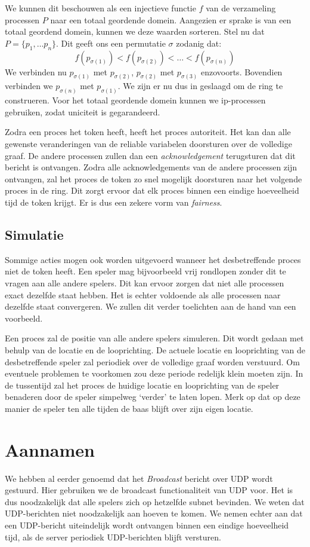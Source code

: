 \documentclass[a4paper,11pt]{article}
\begin{document}
    We kunnen dit beschouwen als een injectieve functie $f$ van de verzameling processen $P$ naar een totaal geordende domein. Aangezien er sprake is van een totaal geordend domein, kunnen we deze waarden sorteren. Stel nu dat $P = \{ p_1, \ldots p_n\}$. Dit geeft ons een permutatie $\sigma$ zodanig dat:
    \[
    f(p_{\sigma(1)}) < f(p_{\sigma(2)}) < \ldots < f(p_{\sigma(n)})
    \]
    We verbinden nu $p_{\sigma(1)}$ met $p_{\sigma(2)}$, $p_{\sigma(2)}$ met $p_{\sigma(3)}$ enzovoorts. Bovendien verbinden we $p_{\sigma(n)}$ met $p_{\sigma(1)}$. We zijn er nu dus in geslaagd om de ring te construeren. Voor het totaal geordende domein kunnen we ip-processen gebruiken, zodat uniciteit is gegarandeerd.

    Zodra een proces het token heeft, heeft het proces autoriteit. Het kan dan alle gewenste veranderingen van de reliable variabelen doorsturen over de volledige graaf. De andere processen zullen dan een \emph{acknowledgement} terugsturen dat dit bericht is ontvangen. Zodra alle acknowledgements van de andere processen zijn ontvangen, zal het proces de token zo snel mogelijk doorsturen naar het volgende proces in de ring. Dit zorgt ervoor dat elk proces binnen een eindige hoeveelheid tijd de token krijgt. Er is dus een zekere vorm van \emph{fairness}.

    \subsection{Simulatie}
    Sommige acties mogen ook worden uitgevoerd wanneer het desbetreffende proces niet de token heeft. Een speler mag bijvoorbeeld vrij rondlopen zonder dit te vragen aan alle andere spelers. Dit kan ervoor zorgen dat niet alle processen exact dezelfde staat hebben. Het is echter voldoende als alle processen naar dezelfde staat convergeren. We zullen dit verder toelichten aan de hand van een voorbeeld.

    Een proces zal de positie van alle andere spelers simuleren. Dit wordt gedaan met behulp van de locatie en de looprichting. De actuele locatie en looprichting van de desbetreffende speler zal periodiek over de volledige graaf worden verstuurd. Om eventuele problemen te voorkomen zou deze periode redelijk klein moeten zijn. In de tussentijd zal het proces de huidige locatie en looprichting van de speler benaderen door de speler simpelweg `verder' te laten lopen. Merk op dat op deze manier de speler ten alle tijden de baas blijft over zijn eigen locatie.

    \section{Aannamen}
    We hebben al eerder genoemd dat het \emph{Broadcast} bericht over UDP wordt gestuurd. Hier gebruiken we de broadcast functionaliteit van UDP voor. Het is dus noodzakelijk dat alle spelers zich op hetzelfde subnet bevinden. We weten dat UDP-berichten niet noodzakelijk aan hoeven te komen. We nemen echter aan dat een UDP-bericht uiteindelijk wordt ontvangen binnen een eindige hoeveelheid tijd, als de server periodiek UDP-berichten blijft versturen.
\end{document}
